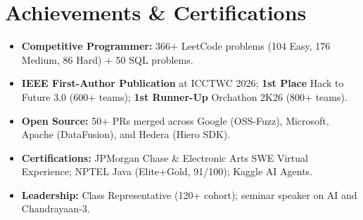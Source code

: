 \documentclass[letterpaper,11pt]{article}
\newcommand{\resumeItem}[1]{
  \item\small{
    {#1 \vspace{-2pt}}
  }
}
\begin{document}
\section{Achievements \& Certifications}
  \begin{itemize}[leftmargin=0.15in, label={}]
    \resumeItem{\textbf{Competitive Programmer:} 366+ LeetCode problems (104 Easy, 176 Medium, 86 Hard) + 50 SQL problems.}
    \resumeItem{\textbf{IEEE First-Author Publication} at ICCTWC 2026; \textbf{1st Place} Hack to Future 3.0 (600+ teams); \textbf{1st Runner-Up} Orchathon 2K26 (800+ teams).}
    \resumeItem{\textbf{Open Source:} 50+ PRs merged across Google (OSS-Fuzz), Microsoft, Apache (DataFusion), and Hedera (Hiero SDK).}
    \resumeItem{\textbf{Certifications:} JPMorgan Chase \& Electronic Arts SWE Virtual Experience; NPTEL Java (Elite+Gold, 91/100); Kaggle AI Agents.}
    \resumeItem{\textbf{Leadership:} Class Representative (120+ cohort); seminar speaker on AI and Chandrayaan-3.}
  \end{itemize}
\end{document}
